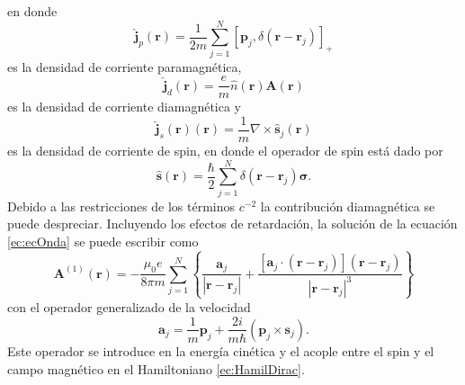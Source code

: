 \documentclass[12pt,a4paper, oneside]{book}
\begin{document}
    en donde
    \begin{equation}
    \hat{\pmb{j}}_p (\pmb{r}) = \frac{1}{2m} \sum_{j=1}^{N} [\pmb{p}_j , \delta(\pmb{r}-\pmb{r}_j)]_+ \label{ec:Jpara} 
    \end{equation} 
    es la densidad de corriente paramagn\'etica,
    \begin{equation}
    \hat{\pmb{j}}_d (\pmb{r}) = \frac{e}{m} \hat{n} (\pmb{r}) \pmb{A} (\pmb{r}) \label{ec:Jdia}
    \end{equation}
    es la densidad de corriente diamagn\'etica y 
    \begin{equation}
    \hat{\pmb{j}}_s (\pmb{r}) (\pmb{r}) = \frac{1}{m} \nabla \times \hat{\pmb{s}}_j (\pmb{r}) \label{ec;Jspin}
    \end{equation}
    es la densidad de corriente de spin, en donde el operador de spin est\'a dado por
    \begin{equation}
    \hat{\pmb{s}} (\pmb{r}) =\frac{\hbar}{2} \sum_{j=1}^{N} \delta (\pmb{r}- \pmb{r}_j) \pmb{\sigma}. \label{ec:SpinOp}
    \end{equation}
    Debido a las restricciones de los t\'erminos $c^{-2}$ la contribuci\'on diamagn\'etica se puede despreciar. Incluyendo los efectos de retardaci\'on, la soluci\'on de la ecuaci\'on \ref{ec:ecOnda} se puede escribir como
    \begin{equation}
    \pmb{A}^{(1)} (\pmb{r}) = - \frac{\mu_0 e}{8 \pi m} \sum_{j=1}^{N} \left\{\frac{\pmb{a}_j}{|\pmb{r}-\pmb{r}_j|} + \frac{[\pmb{a}_j \cdot (\pmb{r}-\pmb{r}_j)] (\pmb{r}- \pmb{r}_j)}{|\pmb{r}-\pmb{r}_j|^3} \right\} \label{ec:SolecOnda}
    \end{equation}
    con el operador generalizado de la velocidad
    \begin{equation}
    \pmb{a}_j = \frac{1}{m} \pmb{p}_j + \frac{2 i }{m \hbar} (\pmb{p}_j \times \pmb{s}_j). \label{ec:genVelocity}
    \end{equation}
    Este operador se introduce en la energ\'ia cin\'etica y el acople entre el spin y el campo magn\'etico en el Hamiltoniano \ref{ec:HamilDirac}. 
    
\end{document}
